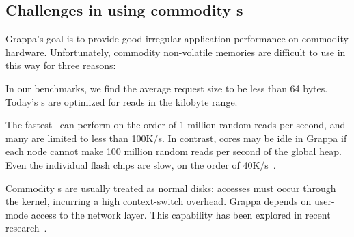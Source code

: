 \subsection{Challenges in using commodity \hspace{0.75pt}s}
Grappa's goal is to provide good irregular application performance on
commodity hardware. Unfortunately, commodity non-volatile memories are
difficult to use in this way for three reasons:

 In our benchmarks, we find the average request size to be
less than 64 bytes. Today's \hspace{0.75pt}s are optimized for reads in the
kilobyte range.  

 The fastest~\cite{fusionio} can
perform on the order of 1 million random reads per second, and many
are limited to less than 100K/s. In contrast, cores may be idle in
Grappa if each node cannot make 100 million random reads per second of
the global heap. Even the individual flash chips are slow, on the order of 40K/s~\cite{micronFlash}.

 Commodity \hspace{0.75pt}s are usually treated
as normal disks: accesses must occur through the kernel, incurring a
high context-switch overhead. Grappa depends on user-mode access to
the network layer. This capability has been explored in recent research~\cite{caulfield:2012}.

